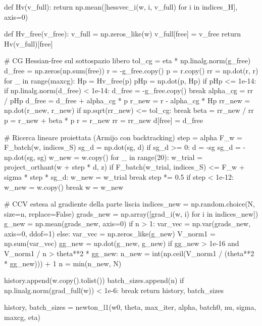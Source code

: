 \begin{pythoncode}[title= Newton-L1]
            def Hv(v_full):
                return np.mean([hessvec_i(w, i, v_full) for i in indices_H],
                               axis=0)

            def Hv_free(v_free):
                v_full = np.zeros_like(w)
                v_full[free] = v_free
                return Hv(v_full)[free]

            # CG Hessian-free sul sottospazio libero
            tol_cg = eta * np.linalg.norm(g_free)
            d_free = np.zeros(np.sum(free))
            r = -g_free.copy()
            p = r.copy()
            rr = np.dot(r, r)
            for _ in range(maxcg):
                Hp = Hv_free(p)
                pHp = np.dot(p, Hp)
                if pHp <= 1e-14:
                    if np.linalg.norm(d_free) < 1e-14:
                        d_free = -g_free.copy()
                    break
                alpha_cg = rr / pHp
                d_free = d_free + alpha_cg * p
                r_new = r - alpha_cg * Hp
                rr_new = np.dot(r_new, r_new)
                if np.sqrt(rr_new) <= tol_cg:
                    break
                beta = rr_new / rr
                p = r_new + beta * p
                r = r_new
                rr = rr_new
            d[free] = d_free

        # Ricerca lineare proiettata (Armijo con backtracking)
        step = alpha
        F_w = F_batch(w, indices_S)
        sg_d = np.dot(sg, d)
        if sg_d >= 0:
            d = -sg
            sg_d = -np.dot(sg, sg)
        w_new = w.copy()
        for _ in range(20):
            w_trial = project_orthant(w + step * d, z)
            if F_batch(w_trial, indices_S) <= F_w + sigma * step * sg_d:
                w_new = w_trial
                break
            step *= 0.5
            if step < 1e-12:
                w_new = w.copy()
                break
        w = w_new

        # CCV estesa al gradiente della parte liscia
        indices_new = np.random.choice(N, size=n, replace=False)
        grads_new = np.array([grad_i(w, i) for i in indices_new])
        g_new = np.mean(grads_new, axis=0)
        if n > 1:
            var_vec = np.var(grads_new, axis=0, ddof=1)
        else:
            var_vec = np.zeros_like(g_new)
        V_norm1 = np.sum(var_vec)
        gg_new = np.dot(g_new, g_new)
        if gg_new > 1e-16 and V_norm1 / n > theta**2 * gg_new:
            n_new = int(np.ceil(V_norm1 / (theta**2 * gg_new))) + 1
            n = min(n_new, N)

        history.append(w.copy().tolist())
        batch_sizes.append(n)
        if np.linalg.norm(grad_full(w)) < 1e-6:
            break
    return history, batch_sizes

history, batch_sizes = newton_l1(w0, theta, max_iter, alpha, batch0,
                                 nu, sigma, maxcg, eta)
\end{pythoncode}


